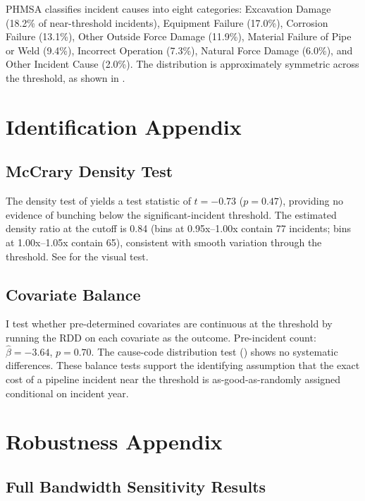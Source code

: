 \documentclass[12pt]{article}
\begin{document}
PHMSA classifies incident causes into eight categories: Excavation Damage (18.2\% of near-threshold incidents), Equipment Failure (17.0\%), Corrosion Failure (13.1\%), Other Outside Force Damage (11.9\%), Material Failure of Pipe or Weld (9.4\%), Incorrect Operation (7.3\%), Natural Force Damage (6.0\%), and Other Incident Cause (2.0\%). The distribution is approximately symmetric across the threshold, as shown in .


\section{Identification Appendix}
\label{sec:app_id}

\subsection{McCrary Density Test}

The density test of \citet{cattaneo2020simple} yields a test statistic of $t = -0.73$ ($p = 0.47$), providing no evidence of bunching below the significant-incident threshold. The estimated density ratio at the cutoff is 0.84 (bins at 0.95x--1.00x contain 77 incidents; bins at 1.00x--1.05x contain 65), consistent with smooth variation through the threshold. See  for the visual test.

\subsection{Covariate Balance}

I test whether pre-determined covariates are continuous at the threshold by running the RDD on each covariate as the outcome. Pre-incident count: $\hat{\beta} = -3.64$, $p = 0.70$. The cause-code distribution test () shows no systematic differences. These balance tests support the identifying assumption that the exact cost of a pipeline incident near the threshold is as-good-as-randomly assigned conditional on incident year.


\section{Robustness Appendix}
\label{sec:app_robust}

\subsection{Full Bandwidth Sensitivity Results}
\end{document}
